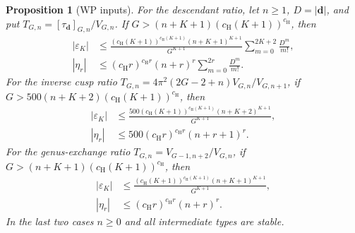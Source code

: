 \documentclass[a4paper,10pt]{article}
\numberwithin{equation}{section}
\theoremstyle{paperplain}
\newtheorem{prp}[thm]{Proposition}
\theoremstyle{paperremark}
\theoremstyle{paperplain}
\begin{document}
\begin{prp}[WP inputs]
For the descendant ratio, let $n\geq1$, $D=|\mathbf d|$, and put
$T_{G,n}=[\tau_{\mathbf d}]_{G,n}/V_{G,n}$. If
$G>(n+K+1)(c_{\mathrm H}(K+1))^{c_{\mathrm H}}$, then
\begin{equation}
\label{eq:s03:hmt-descendant}
\begin{split}
|\varepsilon_K|&\leq
 \frac{(c_{\mathrm H}(K+1))^{c_{\mathrm H}(K+1)}
       (n+K+1)^{K+1}}{G^{K+1}}
 \sum_{m=0}^{2K+2}\frac{D^m}{m!},\\
|\eta_r|&\leq(c_{\mathrm H}r)^{c_{\mathrm H}r}(n+r)^r
 \sum_{m=0}^{2r}\frac{D^m}{m!}.
\end{split}
\end{equation}
For the inverse cusp ratio
$T_{G,n}=4\pi^2(2G-2+n)V_{G,n}/V_{G,n+1}$, if
$G>500(n+K+2)(c_{\mathrm H}(K+1))^{c_{\mathrm H}}$, then
\begin{equation}
\label{eq:s03:hmt-cusp}
\begin{split}
|\varepsilon_K|&\leq
 \frac{500(c_{\mathrm H}(K+1))^{c_{\mathrm H}(K+1)}
       (n+K+2)^{K+1}}{G^{K+1}},\\
|\eta_r|&\leq500(c_{\mathrm H}r)^{c_{\mathrm H}r}(n+r+1)^r.
\end{split}
\end{equation}
For the genus-exchange ratio $T_{G,n}=V_{G-1,n+2}/V_{G,n}$, if
$G>(n+K+1)(c_{\mathrm H}(K+1))^{c_{\mathrm H}}$, then
\begin{equation}
\label{eq:s03:hmt-genus}
\begin{split}
|\varepsilon_K|&\leq
 \frac{(c_{\mathrm H}(K+1))^{c_{\mathrm H}(K+1)}
       (n+K+1)^{K+1}}{G^{K+1}},\\
|\eta_r|&\leq(c_{\mathrm H}r)^{c_{\mathrm H}r}(n+r)^r.
\end{split}
\end{equation}
In the last two cases $n\geq0$ and all intermediate types are stable.
\end{prp}
\end{document}
